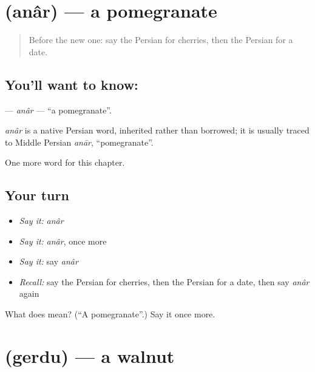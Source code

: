 \section[\texorpdfstring{\fa{انار} (anâr)}{انار (anâr)}]{ (anâr) — a pomegranate}

\label{lesson:FA-C100-anar}



\begin{quote}
Before the new one: say the Persian for cherries, then the Persian for a date.
\end{quote}

\subsection*{You'll want to know: }
\textbf{} — \emph{anâr} — \textquotedblleft{}a pomegranate\textquotedblright{}.

\begin{cousinweb}
\emph{anâr} is a native Persian word, inherited rather than borrowed; it is usually traced to Middle Persian \emph{anār}, \textquotedblleft{}pomegranate\textquotedblright{}.
\end{cousinweb}

\begin{grammarlens}[title={What you've built}]
One more word for this chapter.
\end{grammarlens}

\subsection*{Your turn}
\begin{itemize}
\raggedright
  \item \emph{Say it:} \emph{anâr}
  \item \emph{Say it:} \emph{anâr}, once more
  \item \emph{Say it:} say \emph{anâr}
  \item \emph{Recall:} say the Persian for cherries, then the Persian for a date, then say \emph{anâr} again
\end{itemize}

\begin{tcolorbox}[breakable,colback=teal!4,colframe=teal!35!black,title={Before you move on}]
What does  mean? (\textquotedblleft{}A pomegranate\textquotedblright{}.) Say it once more.
\end{tcolorbox}
\section[\texorpdfstring{\fa{گردو} (gerdu)}{گردو (gerdu)}]{ (gerdu) — a walnut}

